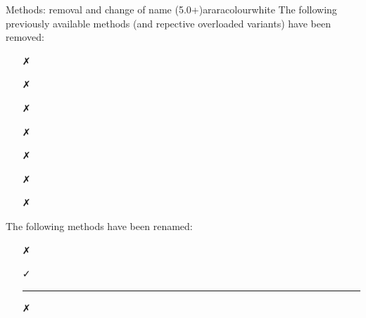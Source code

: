 \begin{messagebox}{Methods: removal and change of name (5.0+)}{araracolour}{\icinfo}{white}
The following previously available methods (and repective overloaded variants) have been removed:

\begin{itemize}
\item[\textcolor{warningcolour}{\faClose}] 
\item[\textcolor{warningcolour}{\faClose}] 
\item[\textcolor{warningcolour}{\faClose}] 
\item[\textcolor{warningcolour}{\faClose}] 
\item[\textcolor{warningcolour}{\faClose}] 
\item[\textcolor{warningcolour}{\faClose}] 
\item[\textcolor{warningcolour}{\faClose}] 
\end{itemize}

The following methods have been renamed:
\begin{itemize}
\item[\textcolor{warningcolour}{\faClose}] 

\vspace{.5em}

\hspace{2cm}\textcolor{teal}{\faArrowDown}

\item[\textcolor{okcolour}{\faCheck}]

\vspace{1em}

{\color{araracolour}\hrule}

\item[\textcolor{warningcolour}{\faClose}] 

\vspace{.5em}

\hspace{2cm}\textcolor{teal}{\faArrowDown}


\end{itemize}
\end{messagebox}
